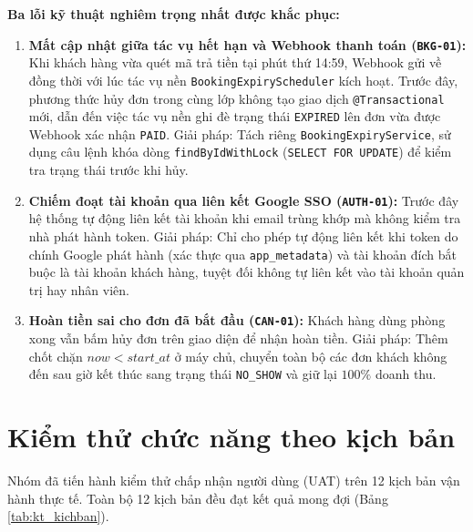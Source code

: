 \noindent\textbf{Ba lỗi kỹ thuật nghiêm trọng nhất được khắc phục:}
\begin{enumerate}
    \item \textbf{Mất cập nhật giữa tác vụ hết hạn và Webhook thanh toán (\texttt{BKG-01}):} Khi khách hàng vừa quét mã trả tiền tại phút thứ 14:59, Webhook gửi về đồng thời với lúc tác vụ nền \texttt{BookingExpiryScheduler} kích hoạt. Trước đây, phương thức hủy đơn trong cùng lớp không tạo giao dịch \texttt{@Transactional} mới, dẫn đến việc tác vụ nền ghi đè trạng thái \texttt{EXPIRED} lên đơn vừa được Webhook xác nhận \texttt{PAID}. Giải pháp: Tách riêng \texttt{BookingExpiryService}, sử dụng câu lệnh khóa dòng \texttt{findByIdWithLock} (\texttt{SELECT FOR UPDATE}) để kiểm tra trạng thái trước khi hủy.
    \item \textbf{Chiếm đoạt tài khoản qua liên kết Google SSO (\texttt{AUTH-01}):} Trước đây hệ thống tự động liên kết tài khoản khi email trùng khớp mà không kiểm tra nhà phát hành token. Giải pháp: Chỉ cho phép tự động liên kết khi token do chính Google phát hành (xác thực qua \texttt{app\_metadata}) và tài khoản đích bắt buộc là tài khoản khách hàng, tuyệt đối không tự liên kết vào tài khoản quản trị hay nhân viên.
    \item \textbf{Hoàn tiền sai cho đơn đã bắt đầu (\texttt{CAN-01}):} Khách hàng dùng phòng xong vẫn bấm hủy đơn trên giao diện để nhận hoàn tiền. Giải pháp: Thêm chốt chặn $now < start\_at$ ở máy chủ, chuyển toàn bộ các đơn khách không đến sau giờ kết thúc sang trạng thái \texttt{NO\_SHOW} và giữ lại $100\%$ doanh thu.
\end{enumerate}

\section{Kiểm thử chức năng theo kịch bản}
\label{sec:kt_kichban}

Nhóm đã tiến hành kiểm thử chấp nhận người dùng (UAT) trên 12 kịch bản vận hành thực tế. Toàn bộ 12 kịch bản đều đạt kết quả mong đợi (Bảng \ref{tab:kt_kichban}).

